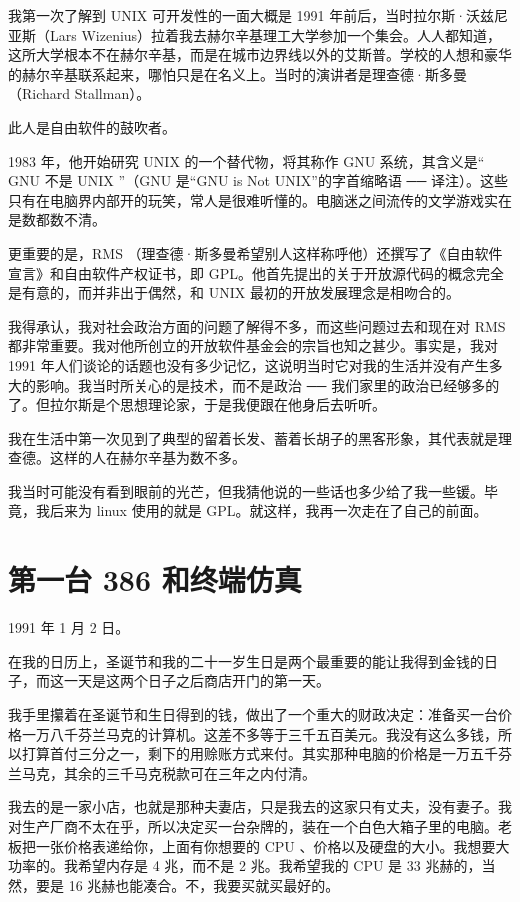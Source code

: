 我第一次了解到 UNIX 可开发性的一面大概是 1991 年前后，当时拉尔斯·沃兹尼亚斯（Lars Wizenius）拉着我去赫尔辛基理工大学参加一个集会。人人都知道，这所大学根本不在赫尔辛基，而是在城市边界线以外的艾斯普。学校的人想和豪华的赫尔辛基联系起来，哪怕只是在名义上。当时的演讲者是理查德·斯多曼（Richard Stallman）。

此人是自由软件的鼓吹者。

1983 年，他开始研究 UNIX 的一个替代物，将其称作 GNU 系统，其含义是“ GNU 不是 UNIX ”（GNU 是“GNU is Not UNIX”的字首缩略语 ── 译注）。这些只有在电脑界内部开的玩笑，常人是很难听懂的。电脑迷之间流传的文学游戏实在是数都数不清。

更重要的是，RMS （理查德·斯多曼希望别人这样称呼他）还撰写了《自由软件宣言》和自由软件产权证书，即 GPL。他首先提出的关于开放源代码的概念完全是有意的，而并非出于偶然，和 UNIX 最初的开放发展理念是相吻合的。

我得承认，我对社会政治方面的问题了解得不多，而这些问题过去和现在对 RMS 都非常重要。我对他所创立的开放软件基金会的宗旨也知之甚少。事实是，我对 1991 年人们谈论的话题也没有多少记忆，这说明当时它对我的生活并没有产生多大的影响。我当时所关心的是技术，而不是政治 ── 我们家里的政治已经够多的了。但拉尔斯是个思想理论家，于是我便跟在他身后去听听。

我在生活中第一次见到了典型的留着长发、蓄着长胡子的黑客形象，其代表就是理查德。这样的人在赫尔辛基为数不多。

我当时可能没有看到眼前的光芒，但我猜他说的一些话也多少给了我一些锾。毕竟，我后来为 linux 使用的就是 GPL。就这样，我再一次走在了自己的前面。

 
\section{第一台 386 和终端仿真}

1991 年 1 月 2 日。

在我的日历上，圣诞节和我的二十一岁生日是两个最重要的能让我得到金钱的日子，而这一天是这两个日子之后商店开门的第一天。

我手里攥着在圣诞节和生日得到的钱，做出了一个重大的财政决定：准备买一台价格一万八千芬兰马克的计算机。这差不多等于三千五百美元。我没有这么多钱，所以打算首付三分之一，剩下的用赊账方式来付。其实那种电脑的价格是一万五千芬兰马克，其余的三千马克税款可在三年之内付清。

我去的是一家小店，也就是那种夫妻店，只是我去的这家只有丈夫，没有妻子。我对生产厂商不太在乎，所以决定买一台杂牌的，装在一个白色大箱子里的电脑。老板把一张价格表递给你，上面有你想要的 CPU 、价格以及硬盘的大小。我想要大功率的。我希望内存是 4 兆，而不是 2 兆。我希望我的 CPU 是 33 兆赫的，当然，要是 16 兆赫也能凑合。不，我要买就买最好的。

